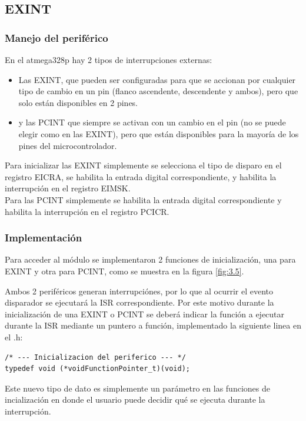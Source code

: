 \subsection{EXINT}
\subsubsection{Manejo del periférico}
En el atmega328p hay 2 tipos de interrupciones externas:
\begin{itemize} 
	\item Las EXINT, que pueden ser configuradas para que se accionan por cualquier tipo de cambio en un pin (flanco ascendente, descendente y ambos), pero que solo están disponibles en 2 pines.
	\item y las PCINT que siempre se activan con un cambio en el pin (no se puede elegir como en las EXINT), pero que están disponibles para la mayoría de los pines del microcontrolador.
\end{itemize}

Para inicializar las EXINT simplemente se selecciona el tipo de disparo en el registro EICRA, se habilita la entrada digital correspondiente, y habilita la interrupción en el registro EIMSK.\\
Para las PCINT simplemente se habilita la entrada digital correspondiente y habilita la interrupción en el registro PCICR.\\

\subsubsection{Implementación}
Para acceder al módulo se implementaron 2 funciones de inicialización, una para EXINT y otra para PCINT, como se muestra en la figura \ref{fig:3.5}.

Ambos 2 periféricos generan interrupciónes, por lo que al ocurrir el evento disparador se ejecutará la ISR correspondiente. Por este motivo durante la inicialización de una EXINT o PCINT se deberá indicar la función a ejecutar durante la ISR mediante un puntero a función, implementado la siguiente linea en el .h:
\begin{lstlisting}[style=CStyle]
/* --- Inicializacion del periferico --- */
typedef void (*voidFunctionPointer_t)(void);
\end{lstlisting}

Este nuevo tipo de dato es simplemente un parámetro en las funciones de incialización en donde el usuario puede decidir qué se ejecuta durante la interrupción.


